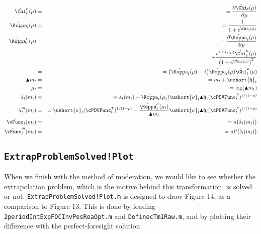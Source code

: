 \documentclass[titlepage,abstract]{\econtex}
\providecommand{\vInv}{\ensuremath{\scriptstyle \Lambda \displaystyle}}
\begin{document}
\begin{itemize}
            \begin{equation}\begin{gathered}\begin{aligned}
            \hat{\Chi}^{\mu}_{t}(\mu)  &=& =  \frac{\partial \hat{\Chi}_{t}(\mu)}{\partial \mu} \\
            \hat{\Koppa}_{t} (\mu)  &=& =  \frac{1}{1+e^{\hat{\Chi}_{t}(\mu)}} \\
            \hat{\Koppa}^{\mu}_{t} (\mu)  &=& =  \frac{\partial \hat{\Koppa}_{t} (\mu)}{\partial \mu} \\
             &=& =  -\frac{e^{\hat{\Chi}_{t}(\mu)} \hat{\Chi}^{\mu}_{t}(\mu)}{\big(1+e^{\hat{\Chi}_{t}(\mu)}\big)^{2}} \\
             &=& =  \big(\hat{\Koppa}_{t} (\mu)-1\big)\hat{\Koppa}_{t} (\mu) \hat{\Chi}^{\mu}_{t}(\mu) \\
            \blacktriangle m_{t}  &=& =  m_{t} + \ushort{\mathfrak{h}}_{t} \\
            \mu_{t}  &=& =  \log(\blacktriangle m_{t}) \\
            \hat{\vInv}_{t} (m_{t})  &=& =  \bar{\vInv}_{t}(m_{t})-\hat{\Koppa}_{t} (\mu_{t}) \ushort{\kappa}_{t} \blacktriangle \mathfrak{h}_{t} (\cPDVFunc_{t}^{T})^{1/(1-\rho)} \\
            \hat{\vInv}_{t}^{m} (m_{t})  &=& =  \ushort{\kappa}_{t} (\cPDVFunc_{t}^{T})^{1/(1-\rho)}-\frac{\hat{\Koppa}_{t}^{\mu}(\mu_{t})}{\blacktriangle m_{t}} \ushort{\kappa}_{t} \blacktriangle \mathfrak{h}_{t} (\cPDVFunc_{t}^{T})^{1/(1-\rho)} \\
            \hat{\vFunc}_{t} (m_{t})  &=& =  u\big(\hat{\vInv}_{t}(m_{t})\big) \\
            \hat{\vFunc}_{t}^{m} (m_{t})  &=& =  u\text{P}\big(\hat{c}_{t}(m_{t})\big)
            \end{aligned}\end{gathered}\end{equation}
\end{itemize}

\subsection{\texttt{ExtrapProblemSolved!Plot}}

When we finish with the method of moderation, we would like to see whether the extrapolation problem, which is the motive behind this transformation, is solved or not. \texttt{ExtrapProblemSolved!Plot.m} is designed to draw Figure 14, as a comparison to Figure 13. This is done by loading \texttt{2periodIntExpFOCInvPesReaOpt.m} and \texttt{DefinecTm1Raw.m}, and by plotting their difference with the perfect-foresight solution.
\end{document}
